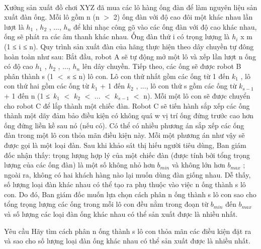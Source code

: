  

Xưởng sản xuất đồ chơi XYZ đã mua các lô hàng ống đàn để làm nguyên liệu sản xuất đàn ống. Mỗi lô gồm n (n $>$ 2) ống đàn với độ cao đôi một khác nhau lần lượt là $h_{1}$ , $h_{2}$ , ..., $h_{n}$ để khi nhạc công gõ vào các ống đàn với độ cao khác nhau, ống sẽ phát ra các âm thanh khác nhau. Ống đàn thứ i có trọng lượng là $h_{i}$ x m (1 ≤ i ≤ n). Quy trình sản xuất đàn của hãng thực hiện theo dây chuyền tự đông hoàn toàn như sau: Bắt đầu, robot A sẽ tự động mở một lô và xếp lần lượt n ống có độ cao $h_{1}$ , $h_{2}$ , ..., $h_{n}$ lên dây chuyền. Tiếp theo, các ống sẽ được robot B phân thành s (1 $<$ s ≤ n) lô con. Lô con thứ nhất gồm các ống từ 1 đến $k_{1}$ , lô con thứ hai gồm các ống từ $k_{1}$ + 1 đến $k_{2}$ , ..., lô con thứ s gồm các ống từ $k_{s-1}$ + 1 đến n (1 ≤ $k_{1}$ $<$ $k_{2}$ $<$ ... $<$ $k_{s-1}$ $<$ n). Mỗi một lô con sẽ được chuyển cho robot C để lắp thành một chiếc đàn. Robot C sẽ tiến hành sắp xếp các ống thành một dãy đảm bảo điều kiện có không quá w vị trí ống đứng trước cao hơn ống đứng liền kề sau nó (nếu có). Có thể có nhiều phương án sắp xếp các ống đàn trong một lô con thỏa mãn điều kiện này. Mỗi một phương án như vậy sẽ được gọi là một loại đàn. Sau khi khảo sát thị hiếu người tiêu dùng, Ban giám đốc nhận thấy: trọng lượng hợp lý của một chiếc đàn (được tính bởi tổng trọng lượng của các ống đàn) là một số không nhỏ hơn $b_{min}$ và không lớn hơn $b_{max}$ ; ngoài ra, không có hai khách hàng nào lại muốn dùng đàn giống nhau. Dễ thấy, số lượng loại đàn khác nhau có thể tạo ra phụ thuộc vào việc n ống thành s lô con. Do đó, Ban giám đốc muốn lựa chọn cách phân n ống thành s lô con sao cho tổng trọng lượng các ống trong mỗi lô con đều nằm trong đoạn từ $b_{min}$ đến $b_{max}$ và số lượng các loại đàn ống khác nhau có thể sản xuất được là nhiều nhất.

Yêu cầu
Hãy tìm cách phân n ống thành s lô con thỏa mãn các điều kiện đặt ra và sao cho số lượng loại đàn ống khác nhau có thể sản xuất được là nhiều nhất.
